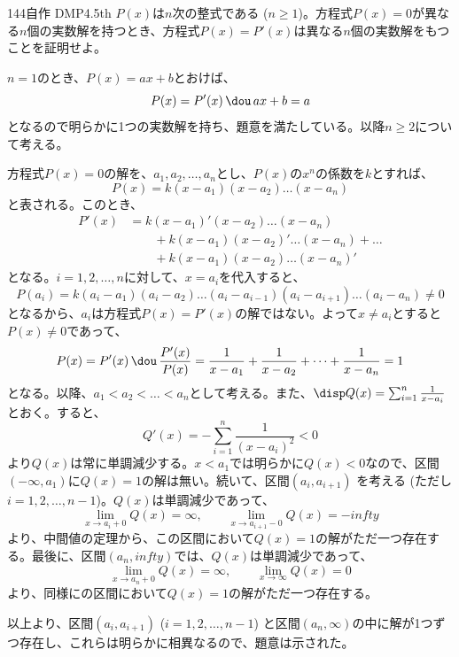\begin{prob}{144}{}{自作 DMP4.5th}
 $P(x)$は$n$次の整式である ($n\ge 1$)。方程式$P(x)=0$が異なる$n$個の実数解を持つとき、方程式$P(x)=P'(x)$は異なる$n$個の実数解をもつことを証明せよ。
\end{prob}
$n=1$のとき、$P(x)=ax+b$とおけば、
\[ P(x)=P'(x) \,\dou\, ax+b=a \]
となるので明らかに1つの実数解を持ち、題意を満たしている。以降$n\ge 2$について考える。

方程式$P(x)=0$の解を、$a_1, a_2, \dots , a_n$とし、$P(x)$の$x^n$の係数を$k$とすれば、
\[ P(x)=k(x-a_1)(x-a_2)\dots(x-a_n) \]
と表される。このとき、
\begin{align*}
 P'(x)&=k(x-a_1)' (x-a_2)\dots(x-a_n) \\
 &\qquad +k(x-a_1)(x-a_2)' \dots (x-a_n)+\dots \\
 &\qquad +k(x-a_1)(x-a_2)\dots(x-a_n)'
\end{align*}
となる。$i=1,2,\dots, n$に対して、$x=a_i$を代入すると、
\[ P(a_i)=k(a_i-a_1)(a_i-a_2)\dots(a_i-a_{i-1})(a_i-a_{i+1})\dots(a_i-a_n) \neq 0 \]
となるから、$a_i$は方程式$P(x)=P'(x)$の解ではない。よって$x\neq a_i$とすると$P(x)\neq 0$であって、
\[ P(x)=P'(x) \,\dou\, \frac{P'(x)}{P(x)}=\frac{1}{x-a_1}+\frac{1}{x-a_2}+\dots+\frac{1}{x-a_n}=1 \]
となる。以降、$a_1<a_2<\dots<a_n$として考える。また、$\disp Q(x)=\sum_{i=1}^n \frac{1}{x-a_i}$とおく。すると、
\[ Q'(x)=-\sum_{i=1}^n \frac{1}{(x-a_i)^2} < 0 \]
より$Q(x)$は常に単調減少する。$x<a_1$では明らかに$Q(x)<0$なので、区間$(-\infty, a_1)$に$Q(x)=1$の解は無い。続いて、区間$(a_i, a_{i+1})$ を考える (ただし$i=1, 2, \dots, n-1$)。$Q(x)$は単調減少であって、
\[ \lim_{x\to a_i+0} Q(x)=\infty, \qquad \lim_{x\to a_{i+1}-0} Q(x)=-infty \]
より、中間値の定理から、この区間において$Q(x)=1$の解がただ一つ存在する。最後に、区間$(a_n, infty)$では、$Q(x)$は単調減少であって、
\[ \lim_{x\to a_n+0} Q(x)=\infty, \qquad \lim_{x\to\infty} Q(x)=0 \]
より、同様にの区間において$Q(x)=1$の解がただ一つ存在する。

以上より、区間$(a_i, a_{i+1})$ ($i=1,2,\dots, n-1$) と区間$(a_n, \infty)$の中に解が1つずつ存在し、これらは明らかに相異なるので、題意は示された。